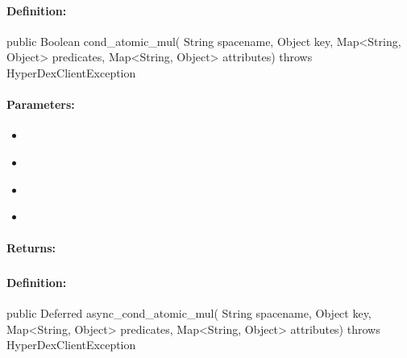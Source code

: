 \paragraph{Definition:}
\begin{javacode}
public Boolean cond_atomic_mul(
        String spacename,
        Object key,
        Map<String, Object> predicates,
        Map<String, Object> attributes) throws HyperDexClientException
\end{javacode}

\paragraph{Parameters:}
\begin{itemize}[noitemsep]
\item {}\\

\item {}\\

\item {}\\

\item {}\\

\end{itemize}

\paragraph{Returns:}


\pagebreak
\subsubsection{}
\label{api:java:async_cond_atomic_mul}


\paragraph{Definition:}
\begin{javacode}
public Deferred async_cond_atomic_mul(
        String spacename,
        Object key,
        Map<String, Object> predicates,
        Map<String, Object> attributes) throws HyperDexClientException
\end{javacode}

